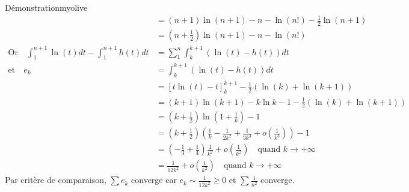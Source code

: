 \begin{demo}{Démonstration}{myolive}
\begin{align*}
                &= (n+1) \ln(n+1) -n - \ln(n!) - \frac{1}{2} \ln(n+1) \\
                &= \left( n + \frac{1}{2} \right)\ln(n+1) - n - \ln(n!) \\
                \text{Or} \quad \int_{1}^{n+1} \ln(t)dt - \int_{1}^{n+1} h(t)dt 
                &= \sum_{1}^{n} \int_{k}^{k+1} (\ln(t) - h(t)) dt \\
                \text{et} \quad e_k 
                &= \int_{k}^{k+1} (\ln(t) - h(t))dt \\
                &= \left[ t \ln(t) - t \right]_k^{k+1} - \frac{1}{2} (\ln(k) + \ln(k+1)) \\
                &= (k+1) \ln(k+1) - k \ln k -1 - \frac{1}{2} (\ln(k) + \ln(k+1)) \\
                &= \left(k + \frac{1}{2}\right) \ln\left(1 + \frac{1}{k}\right) - 1 \\
                &= \left(k+ \frac{1}{2}\right) \left(\frac{1}{k} - \frac{1}{2k^2} + \frac{1}{3k^3} + o\left(\frac{1}{k^3}\right)\right) - 1 \\
                &= \left(-\frac{1}{3} + \frac{1}{4}\right) \frac{1}{k^2} + o\left(\frac{1}{k^2}\right) \quad \text{quand } k \rightarrow +\infty \\
                &= \frac{1}{12k^2} + o\left(\frac{1}{k^2}\right) \quad \text{quand } k \rightarrow +\infty 
            \end{align*}
            Par critère de comparaison, $\sum e_k$ converge car $e_k \sim \frac{1}{12k^2} \geq 0$ et $\sum \frac{1}{n^2}$ converge.
    

\end{demo}
